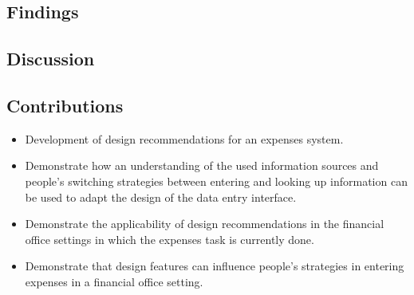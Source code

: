 \subsection{Findings}

\subsection{Discussion}

\subsection{Contributions}
\begin{itemize}
\item
Development of design recommendations for an expenses system.
\item
Demonstrate how an understanding of the used information sources and people's switching strategies between entering and looking up information can be used to adapt the design of the data entry interface. 
\item
Demonstrate the applicability of design recommendations in the financial office settings in which the expenses task is currently done. 
\item
Demonstrate that design features can influence people's strategies in entering expenses in a financial office setting.
\end{itemize}


